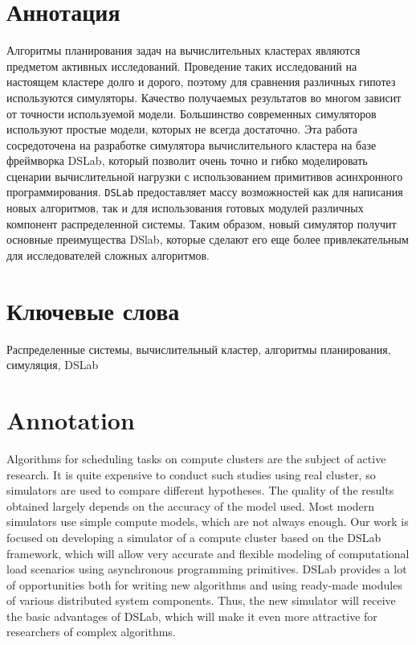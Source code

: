 
\section*{Аннотация}

\vspace{-0.5cm}
Алгоритмы планирования задач на вычислительных кластерах являются предметом активных исследований. Проведение таких исследований на настоящем кластере долго и дорого, поэтому для сравнения различных гипотез используются симуляторы. Качество получаемых результатов во многом зависит от точности используемой модели. Большинство современных симуляторов используют простые модели, которых не всегда достаточно. Эта работа сосредоточена на разработке симулятора вычислительного кластера на базе фреймворка DSLab, который позволит очень точно и гибко моделировать сценарии вычислительной нагрузки с использованием примитивов асинхронного программирования. \texttt{DSLab} предоставляет массу возможностей как для написания новых алгоритмов, так и для использования готовых модулей различных компонент распределенной системы. Таким образом, новый симулятор получит основные преимущества DSlab, которые сделают его еще более привлекательным для исследователей сложных алгоритмов.

\vspace{-0.5cm}
\section*{Ключевые слова}

Распределенные системы, вычислительный кластер, алгоритмы планирования, симуляция, DSLab
\vspace{-0.5cm}
\section*{Annotation}
\vspace{-0.5cm}
Algorithms for scheduling tasks on compute clusters are the subject of active research. It is quite expensive to conduct such studies using real cluster, so simulators are used to compare different hypotheses. The quality of the results obtained largely depends on the accuracy of the model used. Most modern simulators use simple compute models, which are not always enough. Our work is focused on developing a simulator of a compute cluster based on the DSLab framework, which will allow very accurate and flexible modeling of computational load scenarios using asynchronous programming primitives. DSLab provides a lot of opportunities both for writing new algorithms and using ready-made modules of various distributed system components. Thus, the new simulator will receive the basic advantages of DSLab, which will make it even more attractive for researchers of complex algorithms.


